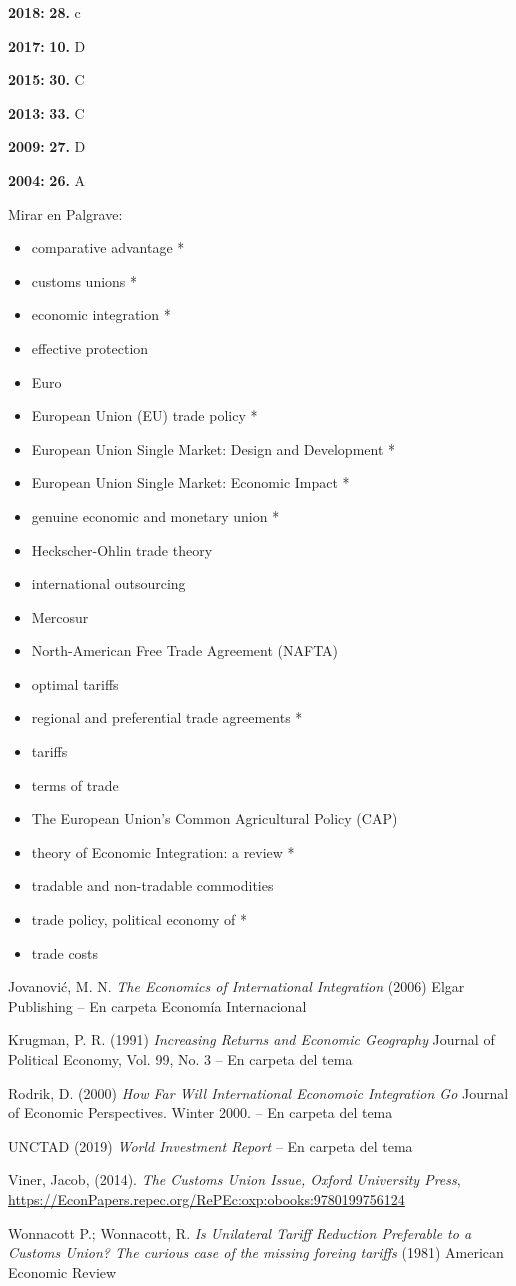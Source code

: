 \documentclass{nuevotema}
\begin{document}
\notas

\textbf{2018:} \textbf{28.} c

\textbf{2017:} \textbf{10.} D

\textbf{2015:} \textbf{30.} C

\textbf{2013:} \textbf{33.} C

\textbf{2009:} \textbf{27.} D

\textbf{2004:} \textbf{26.} A

\bibliografia

Mirar en Palgrave:
\begin{itemize}
	\item comparative advantage *
	\item customs unions *
	\item economic integration *
	\item effective protection
	\item Euro
	\item European Union (EU) trade policy *
	\item European Union Single Market: Design and Development *
	\item European Union Single Market: Economic Impact *
	\item genuine economic and monetary union *
	\item Heckscher-Ohlin trade theory
	\item international outsourcing
	\item Mercosur
	\item North-American Free Trade Agreement (NAFTA)
	\item optimal tariffs
	\item regional and preferential trade agreements *
	\item tariffs
	\item terms of trade
	\item The European Union's Common Agricultural Policy (CAP)
	\item theory of Economic Integration: a review *
	\item tradable and non-tradable commodities
	\item trade policy, political economy of *
	\item trade costs
\end{itemize}

Jovanović, M. N. \textit{The Economics of International Integration} (2006) Elgar Publishing -- En carpeta Economía Internacional

Krugman, P. R. (1991) \textit{Increasing Returns and Economic Geography} Journal of Political Economy, Vol. 99, No. 3 -- En carpeta del tema

Rodrik, D. (2000) \textit{How Far Will International Economoic Integration Go} Journal of Economic Perspectives. Winter 2000. -- En carpeta del tema

UNCTAD (2019) \textit{World Investment Report} -- En carpeta del tema

Viner, Jacob, (2014). \textit{The Customs Union Issue, Oxford University Press}, \url{https://EconPapers.repec.org/RePEc:oxp:obooks:9780199756124}

Wonnacott P.; Wonnacott, R. \textit{Is Unilateral Tariff Reduction Preferable to a Customs Union? The curious case of the missing foreing tariffs} (1981) American Economic Review 
\end{document}
